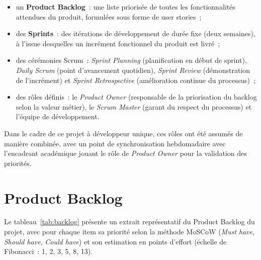 \begin{itemize}[label=\textbullet,font=\normalsize]
    \item un \textbf{Product Backlog}~: une liste priorisée de toutes les fonctionnalités attendues du produit, formulées sous forme de user stories~;
    \item des \textbf{Sprints}~: des itérations de développement de durée fixe (deux semaines), à l'issue desquelles un incrément fonctionnel du produit est livré~;
    \item des cérémonies Scrum~: \textit{Sprint Planning} (planification en début de sprint), \textit{Daily Scrum} (point d'avancement quotidien), \textit{Sprint Review} (démonstration de l'incrément) et \textit{Sprint Retrospective} (amélioration continue du processus)~;
    \item des rôles définis~: le \textit{Product Owner} (responsable de la priorisation du backlog selon la valeur métier), le \textit{Scrum Master} (garant du respect du processus) et l'équipe de développement.
\end{itemize}

Dans le cadre de ce projet à développeur unique, ces rôles ont été assumés de manière combinée, avec un point de synchronisation hebdomadaire avec l'encadrant académique jouant le rôle de \textit{Product Owner} pour la validation des priorités.

\section{Product Backlog}

Le tableau~\ref{tab:backlog} présente un extrait représentatif du Product Backlog du projet, avec pour chaque item sa priorité selon la méthode MoSCoW (\textit{Must have}, \textit{Should have}, \textit{Could have}) et son estimation en points d'effort (échelle de Fibonacci~: 1, 2, 3, 5, 8, 13).


